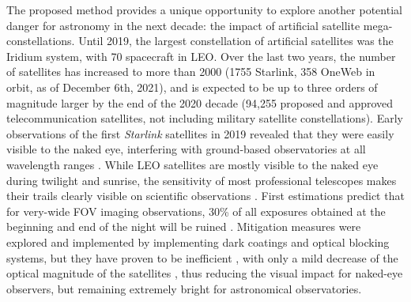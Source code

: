 \documentclass[usenames,dvipsnames,modern]{CLASS_FILES/aastex631}  %
\begin{document}
The proposed method provides a unique opportunity to explore another potential danger for astronomy in the next decade: the impact of artificial satellite mega-constellations. Until 2019, the largest constellation of artificial satellites was the Iridium system, with 70 spacecraft in LEO. Over the last two years, the number of satellites has increased to more than 2000 (1755 Starlink, 358 OneWeb in orbit, as of December 6th, 2021), and is expected to be up to three orders of magnitude larger by the end of the 2020 decade (94,255 proposed and approved telecommunication satellites, not including military satellite constellations). Early observations of the first \emph{Starlink} satellites in 2019 revealed that they were easily visible to the naked eye, interfering with ground-based observatories at all wavelength ranges \citep{mcdowell2020apj892_36, corbett+2020apj903_27}. While LEO satellites are mostly visible to the naked eye during twilight and sunrise, the sensitivity of most professional telescopes makes their trails clearly visible on scientific observations \citep{dugan2020jaavso48_262}. First estimations predict that for very-wide FOV imaging observations, 30\% of all exposures obtained at the beginning and end of the night will be ruined \citep{hainaut+2020aap636_121}. Mitigation measures were explored and implemented by implementing dark coatings and optical blocking systems, but they have proven to be inefficient \citep{tyson+2020aj160_226}, with only a mild decrease of the optical magnitude of the satellites \citep[from 4.6 to 5.9 mag, in the case of VisorSat,][]{mallama2021arxiv2101.00374}, thus reducing the visual impact for naked-eye observers, but remaining extremely bright for astronomical observatories.\\
\end{document}
